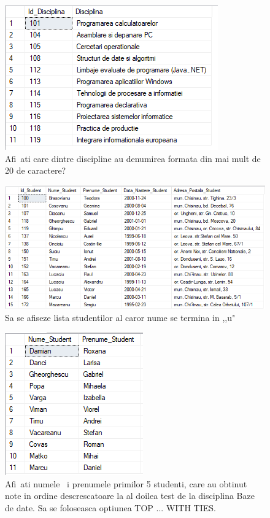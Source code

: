 \documentclass[12pt]{article}
\begin{document}
        
        \begin{figure}[H]
                \centering
                \includegraphics[width=.75\textwidth]{img4.png}
                \caption{Afi~ati care dintre discipline au denumirea formata din mai mult de 20 de caractere? }
        \end{figure}
        \vspace{0.5 cm}

        \begin{figure}[H]
                \centering
                \includegraphics[width=1\textwidth]{img5.png}
                \caption{Sa se afiseze lista studentilor al caror nume se termina in ,,u" }
        \end{figure}
        \vspace{0.5 cm}

        \begin{figure}[H]
                \centering
                \includegraphics[width=.5\textwidth]{img6.png}
                \caption{Afi~ati numele ~i prenumele primilor 5 studenti, care au obtinut note in ordine descrescatoare la al doilea test de la disciplina Baze de date. Sa se foloseasca optiunea TOP ... WITH TIES.}
        \end{figure}
        \vspace{0.5 cm}
\end{document}
